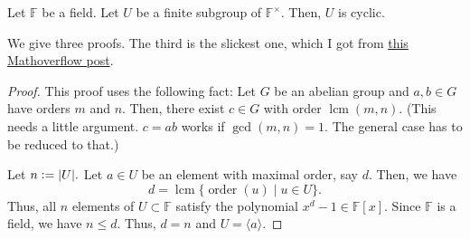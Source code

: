 \begin{thm} \label{thm:finsubgroupcyclic}
    Let $\mathbb{F}$ be a field. Let $U$ be a finite subgroup of $\mathbb{F}^\times.$ Then, $U$ is cyclic. 
\end{thm}
We give three proofs. The third is the slickest one, which I got from \href{https://mathoverflow.net/questions/54735}{this Mathoverflow post}.
\begin{proof} 
    This proof uses the following fact: Let $G$ be an abelian group and $a, b \in G$ have orders $m$ and $n.$ Then, there exist $c \in G$ with order $\operatorname{lcm}(m, n).$ (This needs a little argument. $c = ab$ works if $\gcd(m, n) = 1.$ The general case has to be reduced to that.)

    Let $n \vcentcolon= {\left\lvert U \right\lvert}.$ Let $a \in U$ be an element with maximal order, say $d.$ Then, we have
    \begin{equation*} 
        d = \operatorname{lcm} \{\operatorname{order}(u) \mid u \in U\}.
    \end{equation*}
    Thus, all $n$ elements of $U \subset \mathbb{F}$ satisfy the polynomial $x^d - 1 \in \mathbb{F}[x].$ Since $\mathbb{F}$ is a field, we have $n \le d.$ Thus, $d = n$ and $U = \langle a\rangle.$
\end{proof}


